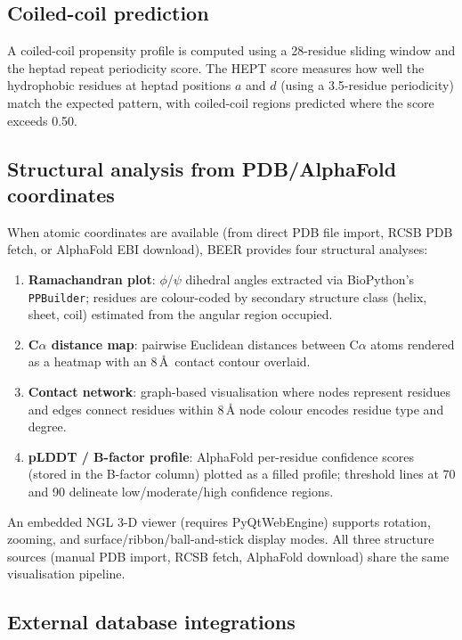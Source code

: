 \documentclass[12pt]{article}
\begin{document}
\subsection{Coiled-coil prediction}

A coiled-coil propensity profile is computed using a 28-residue sliding window
and the heptad repeat periodicity score.
The HEPT score measures how well the hydrophobic residues at heptad positions
$a$ and $d$ (using a 3.5-residue periodicity) match the expected pattern,
with coiled-coil regions predicted where the score exceeds 0.50.

\subsection{Structural analysis from PDB/AlphaFold coordinates}

When atomic coordinates are available (from direct PDB file import, RCSB PDB
fetch, or AlphaFold EBI download), BEER provides four structural analyses:

\begin{enumerate}[noitemsep]
  \item \textbf{Ramachandran plot}: $\phi$/$\psi$ dihedral angles extracted
        via BioPython's \texttt{PPBuilder}; residues are colour-coded by
        secondary structure class (helix, sheet, coil) estimated from the
        angular region occupied.
  \item \textbf{C$\alpha$ distance map}: pairwise Euclidean distances between
        C$\alpha$ atoms rendered as a heatmap with an 8\,\AA\ contact contour
        overlaid.
  \item \textbf{Contact network}: graph-based visualisation where nodes
        represent residues and edges connect residues within 8\,\AA\; node
        colour encodes residue type and degree.
  \item \textbf{pLDDT / B-factor profile}: AlphaFold per-residue confidence
        scores (stored in the B-factor column) plotted as a filled profile;
        threshold lines at 70 and 90 delineate low/moderate/high confidence
        regions.
\end{enumerate}

An embedded NGL 3-D viewer (requires PyQtWebEngine) supports rotation,
zooming, and surface/ribbon/ball-and-stick display modes.
All three structure sources (manual PDB import, RCSB fetch, AlphaFold
download) share the same visualisation pipeline.

\subsection{External database integrations}
\end{document}
